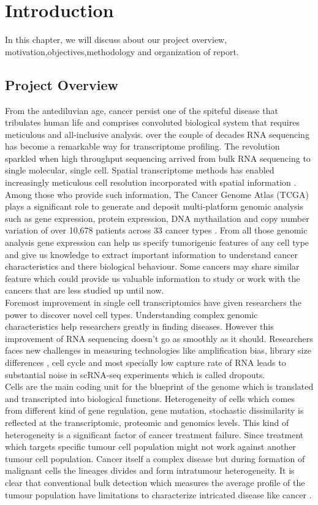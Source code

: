 \chapter{Introduction}
In this chapter, we will discuss about our project overview, motivation,objectives,methodology and organization of report.
\section{Project Overview}
\label{p_view}
From the antediluvian age, cancer persist one of the spiteful disease that tribulates human life and comprises convoluted biological system that requires meticulous and all-inclusive analysis. over the couple of decades RNA sequencing has become a remarkable way for transcriptome profiling. The revolution sparkled when high throughput sequencing arrived \cite{pmid16056220} from bulk RNA sequencing to single molecular, single cell. Spatial transcriptome methods has enabled increasingly meticulous cell resolution incorporated with spatial information \cite{Hong2020}. Among those who provide such information, The Cancer Genome Atlas  (TCGA) plays a significant role to generate and deposit multi-platform genomic analysis such as gene expression, protein expression, DNA mythailation and copy number variation of over 10,678 patients across 33 cancer types \cite{Carrot-Zhang2020}. From all those genomic analysis gene expression can help us specify tumorigenic  features of any cell type and give us knowledge to extract important information to understand cancer characteristics and there biological behaviour. Some cancers may share similar feature which could provide us valuable information to study or work with the cancers that are less studied up until now.\\[10pt]
Foremost improvement in single cell transcriptomics have given researchers the power to discover novel cell types. Understanding complex genomic characteristics help researchers greatly in finding diseases. However this improvement of RNA sequencing doesn't go as smoothly as it should. Researchers faces new challenges in measuring technologies like amplification bias, library size differences \cite{Vallejos2017}, cell cycle \cite{Buettner2015} and most specially low capture rate of RNA \cite{Kharchenko2014} leads to substantial noise in scRNA-seq experiments which is called dropouts. \\[10pt]
Cells are the main coding unit for the blueprint of the genome which is translated and transcripted into biological functions. Heterogeneity of cells which comes from different kind of gene regulation, gene mutation, stochastic dissimilarity is reflected at the transcriptomic, proteomic and genomics levels. This kind of heterogeneity is a significant factor of cancer treatment failure. Since treatment which targets specific tumour cell population might not work against another tumour cell population. Cancer itself a complex disease but during formation of malignant cells the lineages divides and form intratumour heterogeneity. It is clear that conventional bulk detection which measures the average profile of the tumour population have limitations to characterize intricated disease like cancer \cite{Saadatpour2015}. \\[10pt]
